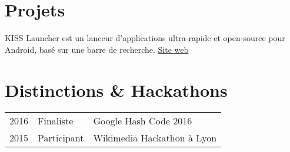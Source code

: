\documentclass[
  french,
  a4paper
]{resume-openfont}
\begin{document}
\begin{minipage}[t]{0.66\textwidth}
\section{Projets}
%
%
KISS Launcher est un lanceur d'applications ultra-rapide et open-source pour Android, basé sur une barre de recherche. \href{http://kisslauncher.com/}{Site web}
\sectionsep


\section{Distinctions \& Hackathons}
\begin{tabular}{@{}rll}
2016       & Finaliste   & Google Hash Code 2016\\
2015       & Participant & Wikimedia Hackathon à Lyon
\end{tabular}
\sectionsep

\end{minipage}
\end{document}
